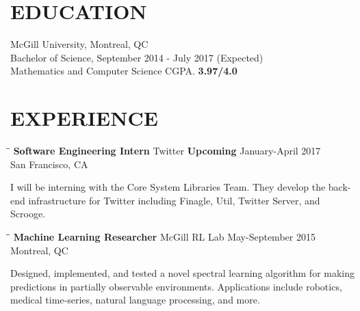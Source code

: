 \documentclass{res}
\begin{document}
 


\address{\bf  CONTACT
\\66 Wolseley Ave North, Montreal, QC, H4X1V7 \\Email: lucas.langer@mail.mcgill.ca
\\Cell: 1-438-491-7656}

\address{\bf LINKS 
\\  Github: lucaslanger}
                                  
\begin{resume}          
 
\section{EDUCATION}          
    McGill University, Montreal, QC  \\        
    Bachelor of Science, September 2014 - July 2017 (Expected)   \\       
    Mathematics and Computer Science
    CGPA. \textbf{3.97/4.0}          

 
\section{EXPERIENCE}
   \vspace{-0.1in}	
   \begin{tabbing}
   \hspace{2.3in}\= \hspace{2.6in}\= \kill %
    {\bf Software Engineering Intern} \> Twitter \> {\bf Upcoming} January-April 2017\\
                          \> San Francisco, CA
   \end{tabbing}\vspace{-20pt}
    I will be interning with the Core System Libraries Team. They develop the back-end infrastructure for Twitter including Finagle, Util, Twitter Server, and Scrooge.
   
   \begin{tabbing}
   \hspace{2.3in}\= \hspace{2.6in}\= \kill %
    {\bf Machine Learning Researcher} \> McGill RL Lab    \> May-September 2015\\
                             \> Montreal, QC
   \end{tabbing}\vspace{-20pt}      %
    Designed, implemented, and tested a novel spectral learning algorithm for making predictions in partially observable environments. Applications include robotics, medical time-series, natural language processing, and more. 
    

\end{resume}
\end{document}
